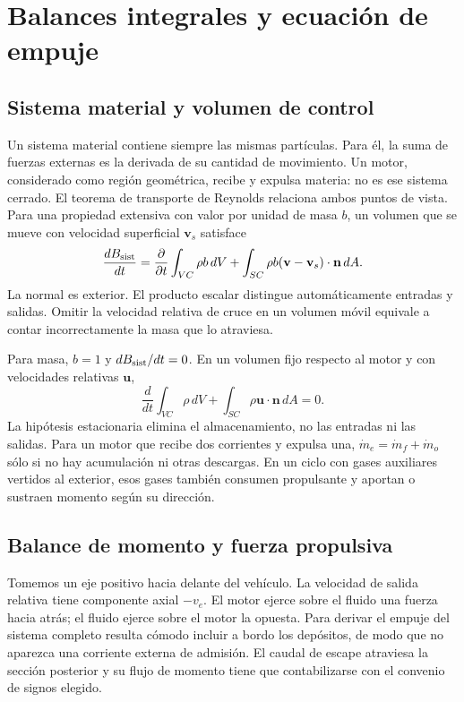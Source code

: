 \chapter{Balances integrales y ecuación de empuje}\label{ch:02}
\section{Sistema material y volumen de control}
Un sistema material contiene siempre las mismas partículas. Para él, la suma de fuerzas externas es la derivada de su cantidad de movimiento. Un motor, considerado como región geométrica, recibe y expulsa materia: no es ese sistema cerrado. El teorema de transporte de Reynolds relaciona ambos puntos de vista. Para una propiedad extensiva con valor por unidad de masa $b$, un volumen que se mueve con velocidad superficial $\mathbf v_s$ satisface
\begin{equation}
\frac{d B_{\rm sist}}{dt}=\frac{\partial}{\partial t}\int_{VC}\rho b\,dV+
\int_{SC}\rho b(\mathbf v-\mathbf v_s)\cdot\mathbf n\,dA.
\end{equation}
La normal es exterior. El producto escalar distingue automáticamente entradas y salidas. Omitir la velocidad relativa de cruce en un volumen móvil equivale a contar incorrectamente la masa que lo atraviesa.

Para masa, $b=1$ y $dB_{\rm sist}/dt=0$. En un volumen fijo respecto al motor y con velocidades relativas $\mathbf u$,
\begin{equation}
\frac{d}{dt}\int_{VC}\rho\,dV+\int_{SC}\rho\mathbf u\cdot\mathbf n\,dA=0.
\end{equation}
La hipótesis estacionaria elimina el almacenamiento, no las entradas ni las salidas. Para un motor que recibe dos corrientes y expulsa una, $\dot m_e=\dot m_f+\dot m_o$ sólo si no hay acumulación ni otras descargas. En un ciclo con gases auxiliares vertidos al exterior, esos gases también consumen propulsante y aportan o sustraen momento según su dirección.
\section{Balance de momento y fuerza propulsiva}
Tomemos un eje positivo hacia delante del vehículo. La velocidad de salida relativa tiene componente axial $-v_e$. El motor ejerce sobre el fluido una fuerza hacia atrás; el fluido ejerce sobre el motor la opuesta. Para derivar el empuje del sistema completo resulta cómodo incluir a bordo los depósitos, de modo que no aparezca una corriente externa de admisión. El caudal de escape atraviesa la sección posterior y su flujo de momento tiene que contabilizarse con el convenio de signos elegido.

